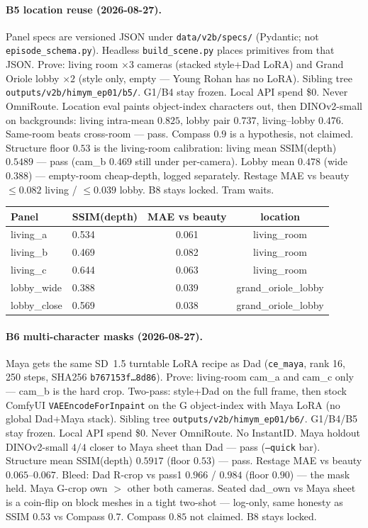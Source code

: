 \documentclass[10pt,twocolumn,letterpaper]{article}
\begin{document}
\paragraph{B5 location reuse (2026-08-27).}
Panel specs are versioned JSON under \texttt{data/v2b/specs/} (Pydantic; not \texttt{episode\_schema.py}). Headless \texttt{build\_scene.py} places primitives from that JSON. Prove: living room $\times 3$ cameras (stacked style+Dad LoRA) and Grand Oriole lobby $\times 2$ (style only, empty --- Young Rohan has no LoRA). Sibling tree \texttt{outputs/v2b/himym\_ep01/b5/}. G1/B4 stay frozen. Local API spend \$0. Never OmniRoute.
Location eval paints object-index characters out, then DINOv2-small on backgrounds: living intra-mean $0.825$, lobby pair $0.737$, living--lobby $0.476$. Same-room beats cross-room --- pass. Compass $0.9$ is a hypothesis, not claimed.
Structure floor $0.53$ is the living-room calibration: living mean SSIM(depth) $0.5489$ --- pass (cam\_b $0.469$ still under per-camera). Lobby mean $0.478$ (wide $0.388$) --- empty-room cheap-depth, logged separately. Restage MAE vs beauty $\le 0.082$ living / $\le 0.039$ lobby. B8 stays locked. Tram waits.

\begin{center}
\small
\begin{tabular}{llcc}
\toprule
Panel & SSIM(depth) & MAE vs beauty & location \\
\midrule
living\_a & 0.534 & 0.061 & living\_room \\
living\_b & 0.469 & 0.082 & living\_room \\
living\_c & 0.644 & 0.063 & living\_room \\
lobby\_wide & 0.388 & 0.039 & grand\_oriole\_lobby \\
lobby\_close & 0.569 & 0.038 & grand\_oriole\_lobby \\
\bottomrule
\end{tabular}
\end{center}

\paragraph{B6 multi-character masks (2026-08-27).}
Maya gets the same SD~1.5 turntable LoRA recipe as Dad (\texttt{ce\_maya}, rank 16, 250 steps, SHA256 \texttt{b767153f\ldots 8d86}). Prove: living-room cam\_a and cam\_c only --- cam\_b is the hard crop. Two-pass: style+Dad on the full frame, then stock ComfyUI \texttt{VAEEncodeForInpaint} on the G object-index with Maya LoRA (no global Dad+Maya stack). Sibling tree \texttt{outputs/v2b/himym\_ep01/b6/}. G1/B4/B5 stay frozen. Local API spend \$0. Never OmniRoute. No InstantID.
Maya holdout DINOv2-small $4/4$ closer to Maya sheet than Dad --- pass (\texttt{--quick} bar). Structure mean SSIM(depth) $0.5917$ (floor $0.53$) --- pass. Restage MAE vs beauty $0.065$--$0.067$.
Bleed: Dad R-crop vs pass1 $0.966$ / $0.984$ (floor $0.90$) --- the mask held. Maya G-crop own $>$ other both cameras. Seated dad\_own vs Maya sheet is a coin-flip on block meshes in a tight two-shot --- log-only, same honesty as SSIM $0.53$ vs Compass $0.7$. Compass $0.85$ not claimed. B8 stays locked.
\end{document}
